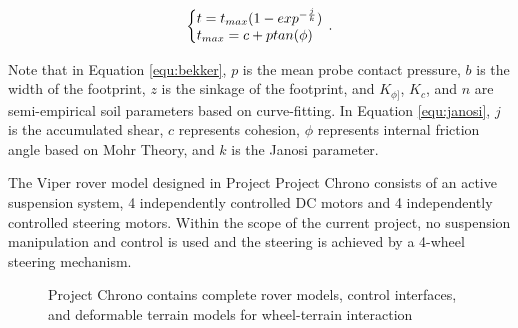 \documentclass{article}
\begin{document}
\begin{equation}
	\label{equ:janosi}
	\left\{\begin{array}{@{}l@{}}
		t = t_{max}(1-exp^{-\frac{j}{k}}) \\
		t_{max}=c+ptan(\phi) \\
	\end{array}\right.\,.
\end{equation}

Note that in Equation \ref{equ:bekker}, $p$ is the mean probe contact pressure, $b$ is the width of the footprint, $z$ is the sinkage of the footprint, and $K_{\phi]}$, $K_{c}$, and $n$ are semi-empirical soil parameters based on curve-fitting. In Equation \ref{equ:janosi}, $j$ is the accumulated shear, $c$ represents cohesion, $\phi$ represents internal friction angle based on Mohr Theory, and $k$ is the Janosi parameter.

The Viper rover model designed in Project Project Chrono consists of an active suspension system, 4 independently controlled DC motors \cite{TR-2021-07} and 4 independently controlled steering motors. Within the scope of the current project, no suspension manipulation and control is used and the steering is achieved by a 4-wheel steering mechanism. 

\begin{figure}
	\centering     %
	\caption{Project Chrono contains complete rover models, control interfaces, and deformable terrain models for wheel-terrain interaction}
\end{figure}
\end{document}
